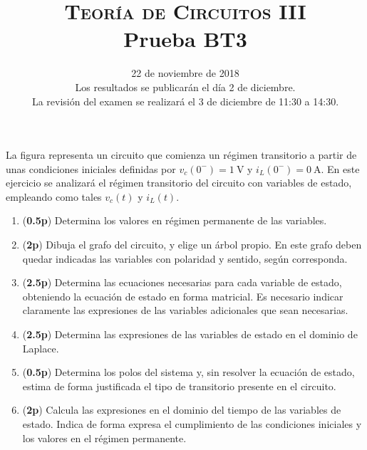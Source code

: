 \documentclass[12pt]{article}
\begin{document}
\title{\textsc{Teoría de Circuitos III}\\Prueba BT3}

\date{22 de noviembre de  2018\\\small{Los resultados se publicarán el día 2 de diciembre.\\La revisión del examen se realizará el 3 de diciembre de 11:30 a 14:30.}}

\maketitle

La figura representa un circuito que comienza un régimen transitorio a partir de unas condiciones iniciales definidas por $v_{c}(0^-) = \SI{1}{\volt}$ y $i_L(0^-) = \SI{0}{\ampere}$. En este ejercicio se analizará el régimen transitorio del circuito con variables de estado, empleando como tales $v_{c}(t)$ y  $i_L(t)$.

\begin{enumerate}

\item (\textbf{0.5p}) Determina los valores en régimen permanente de las variables.
  
\item  (\textbf{2p}) Dibuja el grafo del circuito, y elige un árbol propio. En este grafo deben quedar indicadas las variables con polaridad y sentido, según corresponda.
  
\item  (\textbf{2.5p}) Determina las ecuaciones necesarias para cada variable de estado, obteniendo la ecuación de estado en forma matricial. Es necesario indicar claramente las expresiones de las variables adicionales que sean necesarias.
  
\item  (\textbf{2.5p}) Determina las expresiones de las variables de estado en el dominio de Laplace.
  
\item (\textbf{0.5p}) Determina los polos del sistema y, sin resolver la ecuación de estado, estima de forma justificada el tipo de transitorio presente en el circuito.
  
\item  (\textbf{2p}) Calcula las expresiones en el dominio del tiempo de las variables de estado. Indica de forma expresa el cumplimiento de las condiciones iniciales y los valores en el régimen permanente.
  
\end{enumerate}
\end{document}

